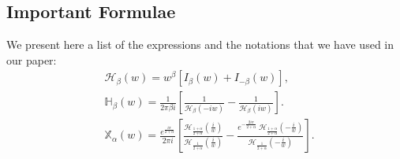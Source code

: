 \documentclass[showpacs,amsmath,amssymb,aps,pre,twocolumn,]{revtex4-1}
\begin{document}
\begin{widetext}
\section{Important Formulae}
\label{appen-ILT-J}
We present here a list of the expressions and the notations that we have used in our paper:
\begin{align}
& \mathcal{H}_{\beta} (w) = w ^{\beta} \left[ I _{\beta}(w)+I_{-\beta} (w)\right],\\
& \mathbb{H}_{\beta}(w)= \frac{1}{2 \pi \beta i} \left[\frac{1}{\mathcal{H}_{\beta} \left( -i w \right)}-\frac{1}{\mathcal{H}_{\beta} \left( i w \right)} \right].
\label{appen-ILT-J-Eq-6} \\
& \mathbb{X}_{\alpha} \left( w\right) =\frac{e^{\frac{i \pi }{2+\alpha}}}{2 \pi i} \left[\frac{\mathcal{H}_{\frac{1+\alpha}{2+\alpha}} \left( \frac{i}{{w}}\right)}{\mathcal{H}_{\frac{1}{2+\alpha}} \left( \frac{i}{{w}}\right)} -\frac{e^{-\frac{2i \pi }{2+\alpha}}~\mathcal{H}_{\frac{1+\alpha}{2+\alpha}} \left( -\frac{i}{{w}}\right)}{\mathcal{H}_{\frac{1}{2+\alpha}} \left(- \frac{i}{{w}}\right)} \right].
\label{appen-ILTYY-eq-7}
\end{align}
\end{widetext}
\end{document}
